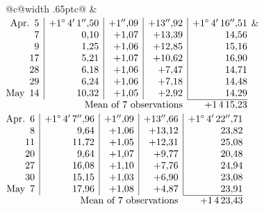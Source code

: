 \noindent\begin{tabular}{@{}c@{\hspace{.4em}\vrule width .65pt\hspace{.4em}}c@{}}
 &
 \\[.18ex]
\(\begin{array}[t]{@{}r|r|r|r|r@{}}
\text{Apr.}\enspace 5 & +1^\circ\,4'\,1''{,}50 & +1''{,}09 & +13''{,}92 & +1^\circ\,4'\,16''{,}51\\
7 & 0{,}10 & +1{,}07 & +13{,}39 & 14{,}56\\
9 & 1{,}25 & +1{,}06 & +12{,}85 & 15{,}16\\
17 & 5{,}21 & +1{,}07 & +10{,}62 & 16{,}90\\
28 & 6{,}18 & +1{,}06 & +7{,}47 & 14{,}71\\
29 & 6{,}24 & +1{,}06 & +7{,}18 & 14{,}48\\
\text{May}\enspace 14 & 10{,}32 & +1{,}05 & +2{,}92 & 14{,}29\\
\cline{5-5}
\multicolumn{4}{r}{\text{Mean of 7 observations}} & +1\,4\,15{,}23
\end{array}\)
&
\(\begin{array}[t]{@{}r|r|r|r|r@{}}
\text{Apr.}\enspace 6 & +1^\circ\,4'\,7''{,}96 & +1''{,}09 & +13''{,}66 & +1^\circ\,4'\,22''{,}71\\
8 & 9{,}64 & +1{,}06 & +13{,}12 & 23{,}82\\
11 & 11{,}72 & +1{,}05 & +12{,}31 & 25{,}08\\
20 & 9{,}64 & +1{,}07 & +9{,}77 & 20{,}48\\
27 & 16{,}08 & +1{,}10 & +7{,}76 & 24{,}94\\
30 & 15{,}15 & +1{,}03 & +6{,}90 & 23{,}08\\
\text{May}\enspace 7 & 17{,}96 & +1{,}08 & +4{,}87 & 23{,}91\\
\cline{5-5}
\multicolumn{4}{r}{\text{Mean of 7 observations}} & +1\,4\,23{,}43
\end{array}\)
\end{tabular}\par\medskip

\par\clearpage
\noindent\makebox[12mm][l]{}\par\medskip

